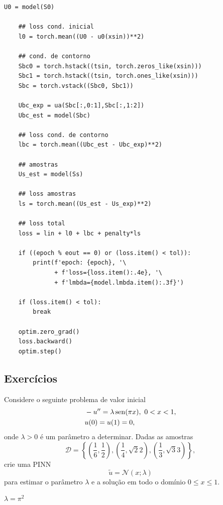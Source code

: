 \begin{ex}
\begin{lstlisting}[caption=ex\_pinn\_fisher.py]
    U0 = model(S0)

    ## loss cond. inicial
    l0 = torch.mean((U0 - u0(xsin))**2)

    ## cond. de contorno
    Sbc0 = torch.hstack((tsin, torch.zeros_like(xsin)))
    Sbc1 = torch.hstack((tsin, torch.ones_like(xsin)))
    Sbc = torch.vstack((Sbc0, Sbc1))

    Ubc_exp = ua(Sbc[:,0:1],Sbc[:,1:2])
    Ubc_est = model(Sbc)

    ## loss cond. de contorno    
    lbc = torch.mean((Ubc_est - Ubc_exp)**2)

    ## amostras
    Us_est = model(Ss)

    ## loss amostras
    ls = torch.mean((Us_est - Us_exp)**2)

    ## loss total
    loss = lin + l0 + lbc + penalty*ls 

    if ((epoch % eout == 0) or (loss.item() < tol)):
        print(f'epoch: {epoch}, '\
              + f'loss={loss.item():.4e}, '\
              + f'lmbda={model.lmbda.item():.3f}')
    
    if (loss.item() < tol):
        break
        
    optim.zero_grad()
    loss.backward()
    optim.step()  
\end{lstlisting}
\end{ex}

\subsection{Exercícios}
\badgeConstrucao

\begin{ex}
  Considere o seguinte problema de valor inicial
  \begin{subequations}
    \begin{align}
      &-u'' = \lambda\operatorname{sen}(\pi x), ~0<x<1,\\
      &u(0) = u(1) = 0,
    \end{align}
  \end{subequations}
  onde $\lambda>0$ é um parâmetro a determinar. Dadas as amostras
  \begin{equation}
    \mathcal{D} = \left\{\left(\frac{1}{6},\frac{1}{2}\right), \left(\frac{1}{4},\sqrt{2}{2}\right), \left(\frac{1}{3},\sqrt{3}{3}\right)\right\},
  \end{equation}
  crie uma PINN 
  \begin{equation}
    \tilde{u} = \mathcal{N}(x;\lambda) 
  \end{equation}
  para estimar o parâmetro $\lambda$ e a solução em todo o domínio $0\leq x\leq 1$.
\end{ex}
\begin{resp}
  $\lambda = \pi^2$
\end{resp}

